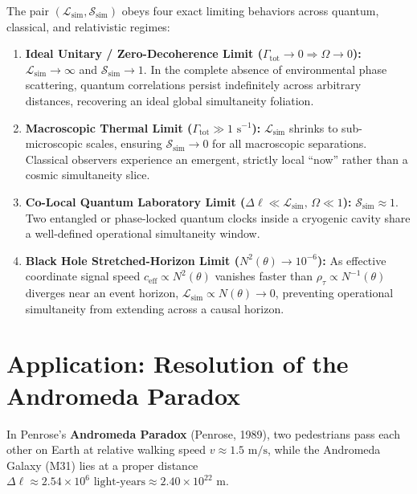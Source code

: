 \documentclass[11pt,a4paper]{article}
\begin{document}
The pair $(\mathcal{L}_{\mathrm{sim}}, \mathcal{S}_{\mathrm{sim}})$ obeys four exact limiting behaviors across quantum, classical, and relativistic regimes:
\begin{enumerate}
    \item \textbf{Ideal Unitary / Zero-Decoherence Limit ($\Gamma_{\mathrm{tot}} \to 0 \Rightarrow \Omega \to 0$):} $\mathcal{L}_{\mathrm{sim}} \to \infty$ and $\mathcal{S}_{\mathrm{sim}} \to 1$. In the complete absence of environmental phase scattering, quantum correlations persist indefinitely across arbitrary distances, recovering an ideal global simultaneity foliation.
    \item \textbf{Macroscopic Thermal Limit ($\Gamma_{\mathrm{tot}} \gg 1\text{ s}^{-1}$):} $\mathcal{L}_{\mathrm{sim}}$ shrinks to sub-microscopic scales, ensuring $\mathcal{S}_{\mathrm{sim}} \to 0$ for all macroscopic separations. Classical observers experience an emergent, strictly local ``now'' rather than a cosmic simultaneity slice.
    \item \textbf{Co-Local Quantum Laboratory Limit ($\Delta \ell \ll \mathcal{L}_{\mathrm{sim}},\, \Omega \ll 1$):} $\mathcal{S}_{\mathrm{sim}} \approx 1$. Two entangled or phase-locked quantum clocks inside a cryogenic cavity share a well-defined operational simultaneity window.
    \item \textbf{Black Hole Stretched-Horizon Limit ($N^2(\theta) \to 10^{-6}$):} As effective coordinate signal speed $c_{\mathrm{eff}} \propto N^2(\theta)$ vanishes faster than $\rho_\tau \propto N^{-1}(\theta)$ diverges near an event horizon, $\mathcal{L}_{\mathrm{sim}} \propto N(\theta) \to 0$, preventing operational simultaneity from extending across a causal horizon.
\end{enumerate}

\section{Application: Resolution of the Andromeda Paradox}

In Penrose's \textbf{Andromeda Paradox} (Penrose, 1989), two pedestrians pass each other on Earth at relative walking speed $v \approx 1.5\text{ m/s}$, while the Andromeda Galaxy (M31) lies at a proper distance $\Delta \ell \approx 2.54 \times 10^6\text{ light-years} \approx 2.40 \times 10^{22}\text{ m}$.
\end{document}

